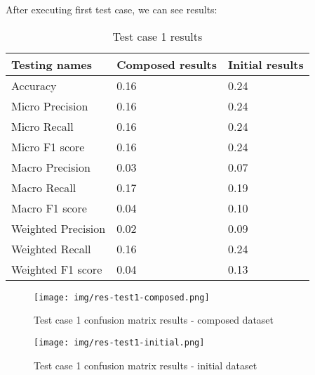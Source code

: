 After executing first test case, we can see results:
\begin{table}[!ht]
  \centering
    \begin{tabular}{ |m{14em}|m{9em}|m{9em}| } 
     \hline
        Testing names & Composed results & Initial results \\ 
     \hline
        Accuracy & 0.16 & 0.24 \\
     \hline
        Micro Precision & 0.16 & 0.24 \\
     \hline
        Micro Recall & 0.16 & 0.24 \\
     \hline
        Micro F1 score & 0.16 & 0.24 \\
     \hline
        Macro Precision & 0.03 & 0.07 \\
     \hline
        Macro Recall & 0.17 & 0.19 \\
     \hline
        Macro F1 score & 0.04 & 0.10 \\
     \hline
        Weighted Precision & 0.02 & 0.09 \\
     \hline
        Weighted Recall & 0.16 & 0.24 \\
     \hline
        Weighted F1 score & 0.04 & 0.13 \\
     \hline
    \end{tabular}
\caption{Test case 1 results}
\end{table}

\begin{figure}[H]
    \centerline{\texttt{[image: img/res-test1-composed.png]}}
    \caption{Test case 1 confusion matrix results - composed dataset}
\end{figure}
\begin{figure}[H]
    \centerline{\texttt{[image: img/res-test1-initial.png]}}
    \caption{Test case 1 confusion matrix results - initial dataset}
\end{figure}